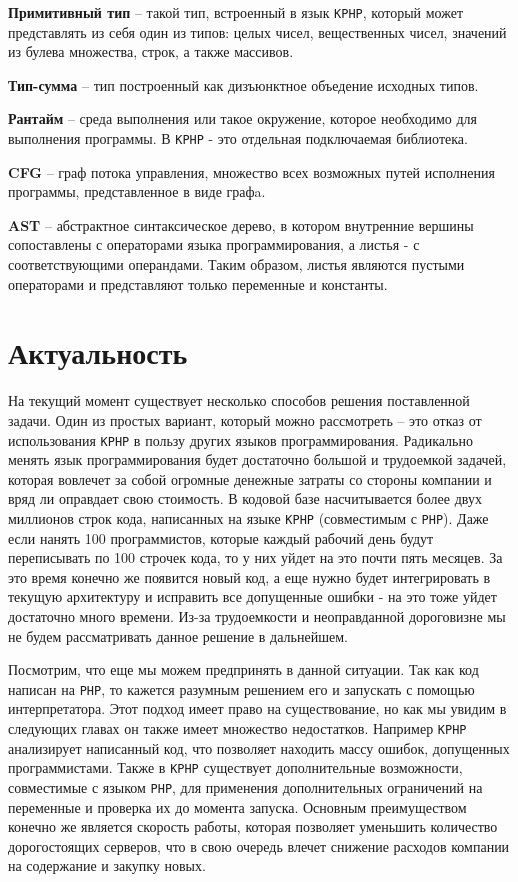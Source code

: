 \textbf{Примитивный тип} -- такой тип, встроенный в язык \verb|KPHP|, который может представлять из себя один из типов: целых чисел, вещественных чисел, значений из булева множества, строк, а также массивов.

\textbf{Тип-сумма} -- тип построенный как дизъюнктное объедение исходных типов.

\textbf{Рантайм} -- среда выполнения или такое окружение, которое необходимо для выполнения программы. В \verb|KPHP| - это отдельная подключаемая библиотека.

\textbf{CFG} -- граф потока управления, множество всех возможных путей исполнения программы, представленное в виде графa.

\textbf{AST} -- абстрактное синтаксическое дерево, в котором внутренние вершины сопоставлены с операторами языка программирования, а листья - с соответствующими операндами. Таким образом, листья являются пустыми операторами и представляют только переменные и константы.

\section{Актуальность}
На текущий момент существует несколько способов решения поставленной задачи. Один из простых вариант, который можно рассмотреть -- это отказ от использования \verb|KPHP| в пользу других языков программирования. 
Радикально менять язык программирования будет достаточно большой и трудоемкой задачей, которая вовлечет за собой огромные денежные затраты со стороны компании и вряд ли оправдает свою стоимость. 
В кодовой базе насчитывается более двух миллионов строк кода, написанных на языке \verb|KPHP| (совместимым с \verb|PHP|).
Даже если нанять 100 программистов, которые каждый рабочий день будут переписывать по 100 строчек кода, то у них уйдет на это почти пять месяцев. За это время конечно же появится новый код, а еще нужно будет интегрировать в текущую архитектуру и исправить все допущенные ошибки - на это тоже уйдет достаточно много времени.
Из-за трудоемкости и неоправданной дороговизне мы не будем рассматривать данное решение в дальнейшем.

Посмотрим, что еще мы можем предпринять в данной ситуации. 
Так как код написан на \verb|PHP|, то кажется разумным решением его и запускать с помощью интерпретатора. 
Этот подход имеет право на существование, но как мы увидим в следующих главах он также имеет множество недостатков.
Например \verb|KPHP| анализирует написанный код, что позволяет находить массу ошибок, допущенных программистами.
Также в \verb|KPHP| существует дополнительные возможности, совместимые с языком \verb|PHP|, для применения дополнительных ограничений на переменные и проверка их до момента запуска.
Основным преимуществом конечно же является скорость работы, которая позволяет уменьшить количество дорогостоящих серверов, что в свою очередь влечет снижение расходов компании на содержание и закупку новых.

